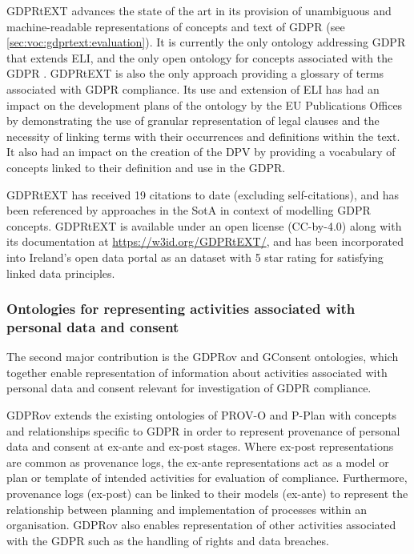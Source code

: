 GDPRtEXT advances the state of the art in its provision of unambiguous and machine-readable representations of concepts and text of GDPR (see \autoref{sec:voc:gdprtext:evaluation}).
It is currently the only ontology addressing GDPR that extends ELI, and the only open ontology for concepts associated with the GDPR \cite{leone_taking_2019}.
GDPRtEXT is also the only approach providing a glossary of terms associated with GDPR compliance.
Its use and extension of ELI has had an impact on the development plans of the ontology by the EU Publications Offices by demonstrating the use of granular representation of legal clauses and the necessity of linking terms with their occurrences and definitions within the text.
It also had an impact on the creation of the DPV by providing a vocabulary of concepts linked to their definition and use in the GDPR.

GDPRtEXT has received 19 citations to date (excluding self-citations), and has been referenced by approaches in the SotA in context of modelling GDPR concepts.
GDPRtEXT is available under an open license (CC-by-4.0) along with its documentation at 
\url{https://w3id.org/GDPRtEXT/}, and has been incorporated into Ireland's open data portal as an dataset with 5 star rating for satisfying linked data principles.

\subsubsection*{Ontologies for representing activities associated with personal data and consent}
The second major contribution is the GDPRov and GConsent ontologies, which together enable representation of information about activities associated with personal data and consent relevant for investigation of GDPR compliance.

GDPRov extends the existing ontologies of PROV-O and P-Plan with concepts and relationships specific to GDPR in order to represent provenance of personal data and consent at ex-ante and ex-post stages. Where ex-post representations are common as provenance logs, the ex-ante representations act as a model or plan or template of intended activities for evaluation of compliance. Furthermore, provenance logs (ex-post) can be linked to their models (ex-ante) to represent the relationship between planning and implementation of processes within an organisation. GDPRov also enables representation of other activities associated with the GDPR such as the handling of rights and data breaches.

